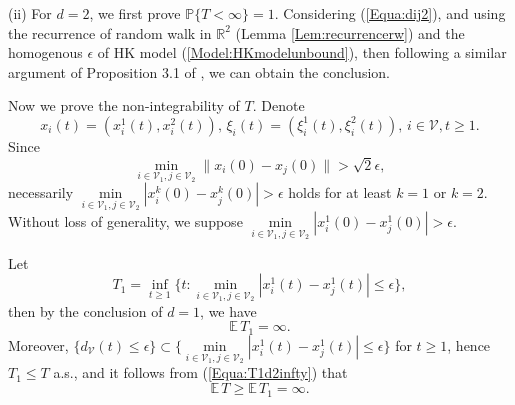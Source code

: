 \documentclass[11pt]{article}
\theoremstyle{definition}
\theoremstyle{remark}
\numberwithin{equation}{section}
\begin{document}
(ii) For $d=2$, we first prove $\mathbb{P}\{T<\infty\}=1$. Considering (\ref{Equa:dij2}), and using the recurrence of random walk in $\mathbb{R}^2$ (Lemma \ref{Lem:recurrencerw}) and the homogenous $\epsilon$ of HK model (\ref{Model:HKmodelunbound}), then following a similar argument of Proposition 3.1 of \cite{Su2019tac}, we can obtain the conclusion.

Now we prove the non-integrability of $T$. Denote
\begin{equation*}
  x_i(t)=(x_i^1(t),x_i^2(t)),\, \xi_i(t)=(\xi_i^1(t),\xi_i^2(t)),\,i\in\mathcal{V}, t\geq 1.
\end{equation*}
Since
\begin{equation*}
  \min\limits_{i\in\mathcal{V}_1, j\in\mathcal{V}_2}\| x_i(0)-x_j(0)\| >\sqrt{2}\epsilon,
\end{equation*}
necessarily $\min\limits_{i\in\mathcal{V}_1, j\in\mathcal{V}_2}|x_i^k(0)-x_j^k(0)|>\epsilon$ holds for at least $k=1$ or $k=2$. Without loss of generality, we suppose $\min\limits_{i\in\mathcal{V}_1, j\in\mathcal{V}_2}|x_i^1(0)-x_j^1(0)|>\epsilon$.

Let
\begin{equation}\label{Equa:defiT1dim2}
  T_1=\inf\limits_{t\geq 1}\{t: \min\limits_{i\in\mathcal{V}_1, j\in\mathcal{V}_2} |x_i^1(t)-x_j^1(t)|\leq\epsilon\},
\end{equation}
then by the conclusion of $d=1$, we have
\begin{equation}\label{Equa:T1d2infty}
  \mathbb{E}\,T_1=\infty.
\end{equation}
Moreover, $\{d_\mathcal{V}(t)\leq\epsilon\}\subset\{\min\limits_{i\in\mathcal{V}_1, j\in\mathcal{V}_2} |x_i^1(t)-x_j^1(t)|\leq\epsilon\}$ for $t\geq 1$, hence
$T_1\leq T$ a.s., and it follows from (\ref{Equa:T1d2infty}) that
\begin{equation*}
  \mathbb{E}\,T\geq\mathbb{E}\,T_1=\infty.
\end{equation*}
\end{document}
